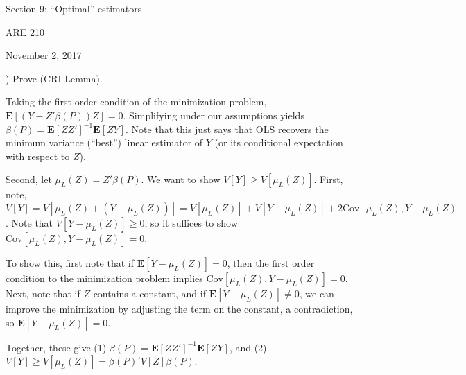 \documentclass[12pt,english]{article}
\begin{document}
\begin{center}
{\Large{}Section 9: ``Optimal'' estimators}
\par\end{center}{\Large \par}

\begin{center}
ARE 210
\par\end{center}

\begin{center}
November 2, 2017
\par\end{center}

) Prove (CRI Lemma).
\vspace{1em}

Taking the first order condition of the minimization problem, $\mathbf{E}[(Y - Z'\beta(P)) Z] = 0$. Simplifying under our assumptions yields $\beta(P) = \mathbf{E}[ZZ']^{-1} \mathbf{E}[ZY]$. Note that this just says that OLS recovers the minimum variance (``best'') linear estimator of $Y$ (or its conditional expectation with respect to $Z$).

Second, let $\mu_{L}(Z) = Z'\beta(P)$. We want to show $V[Y] \geq V[\mu_{L}(Z)]$. First, note, $V[Y] = V[\mu_{L}(Z) + (Y - \mu_{L}(Z))] = V[\mu_{L}(Z)] + V[Y - \mu_{L}(Z)] + 2 \text{Cov}[\mu_{L}(Z), Y - \mu_{L}(Z)]$. Note that $V[Y - \mu_{L}(Z)] \geq 0$, so it suffices to show $\text{Cov}[\mu_{L}(Z), Y - \mu_{L}(Z)] = 0$.

To show this, first note that if $\mathbf{E}[Y - \mu_{L}(Z)] = 0$, then the first order condition to the minimization problem implies $\text{Cov}[\mu_{L}(Z), Y - \mu_{L}(Z)] = 0$. Next, note that if $Z$ contains a constant, and if $\mathbf{E}[Y - \mu_{L}(Z)] \neq 0$, we can improve the minimization by adjusting the term on the constant, a contradiction, so $\mathbf{E}[Y - \mu_{L}(Z)] = 0$.

Together, these give (1) $\beta(P) = \mathbf{E}[Z Z']^{-1} \mathbf{E}[ZY]$, and (2) $V[Y] \geq V[\mu_{L}(Z)] = \beta(P)' V[Z] \beta(P)$.
\end{document}
